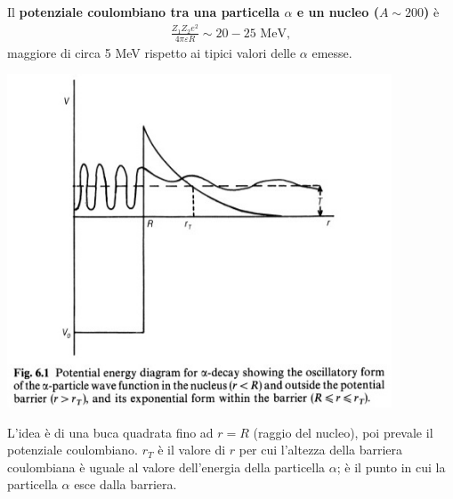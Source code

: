 \documentclass[a4paper,11pt,twoside,openany]{book}
\theoremstyle{definition}
\theoremstyle{plain}
\theoremstyle{plain}
\theoremstyle{definition}
\begin{document}
Il \textbf{potenziale coulombiano tra una particella $\alpha$ e un nucleo ($A\sim 200$)} è
\begin{equation}\begin{split}
\frac{Z_1Z_2e^2}{4\pi\varepsilon R}\sim 20-25 \textrm{ MeV},
\end{split}\end{equation}
maggiore di circa 5 MeV rispetto ai tipici valori delle $\alpha$ emesse.

\begin{center}
\includegraphics[width=4.5in]{immagini/potential_alpha.jpg} %
\end{center}

L'idea è di una buca quadrata fino ad $r=R$ (raggio del nucleo), poi prevale il potenziale coulombiano. $r_T$ è il valore di $r$ per cui l'altezza della barriera coulombiana è uguale al valore dell'energia della particella $\alpha$; è il punto in cui la particella $\alpha$ esce dalla barriera.
\end{document}
